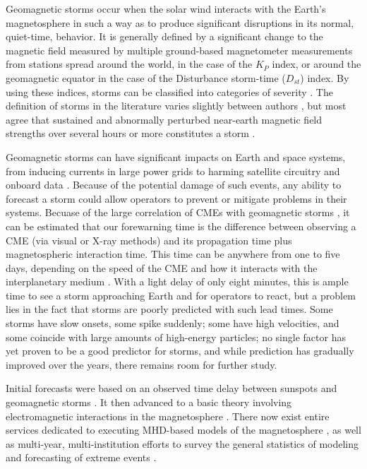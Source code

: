 \documentclass[10pt]{article}
\begin{document}
Geomagnetic storms occur when the solar wind interacts with the Earth's magnetosphere in such a way as to produce significant disruptions in its normal, quiet-time, behavior. It is generally defined by a significant change to the magnetic field measured by multiple ground-based magnetometer measurements from stations spread around the world, in the case of the $K_P$ index, or around the geomagnetic equator in the case of the Disturbance storm-time ($D_{st}$) index. By using these indices, storms can be classified into categories of severity \citep{NOAAScale}. The definition of storms in the literature varies slightly between authors \citep{Yermolaev}, but most agree that sustained and abnormally perturbed near-earth magnetic field strengths over several hours or more constitutes a storm \citep{StormDefinition}. 

Geomagnetic storms can have significant impacts on Earth and space systems, from inducing currents in large power grids to harming satellite circuitry and onboard data \citep{1989Storm}. Because of the potential damage of such events, any ability to forecast a storm could allow operators to prevent or mitigate problems in their systems. Becuase of the large correlation of CMEs with geomagnetic storms \citep{Yermolaev}, it can be estimated that our forewarning time is the difference between observing a CME (via visual or X-ray methods) and its propagation time plus magnetospheric interaction time. This time can be anywhere from one to five days, depending on the speed of the CME and how it interacts with the interplanetary medium \citep{StormSources}. With a light delay of only eight minutes, this is ample time to see a storm approaching Earth and for operators to react, but a problem lies in the fact that storms are poorly predicted with such lead times\cite{WeigelDecisionTheory}. Some storms have slow onsets, some spike suddenly; some have high velocities, and some coincide with large amounts of high-energy particles; no single factor has yet proven to be a good predictor for storms, and while prediction has gradually improved over the years, there remains room for further study. 

Initial forecasts were based on an observed time delay between sunspots and geomagnetic storms \citep{SunspotStorms}. It then advanced to a basic theory involving electromagnetic interactions in the magnetosphere \citep{Chapman}. There now exist entire services dedicated to executing MHD-based models of the magnetosphere \citep{CCMC}, as well as multi-year, multi-institution efforts to survey the general statistics of modeling and forecasting of extreme events \citep{ExtremeEvents}.
\end{document}
